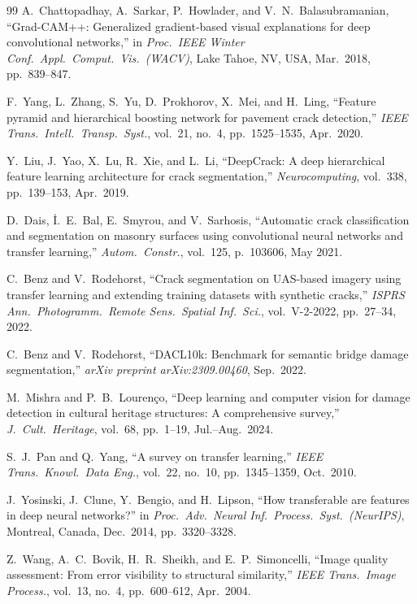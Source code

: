 \documentclass[12pt,a4paper]{article}
\begin{document}
\begin{thebibliography}{99}
A.~Chattopadhay, A.~Sarkar, P.~Howlader, and V.~N.~Balasubramanian,
``Grad-CAM++: Generalized gradient-based visual explanations for deep convolutional networks,''
in \textit{Proc.\ IEEE Winter Conf.\ Appl.\ Comput.\ Vis.\ (WACV)},
Lake Tahoe, NV, USA, Mar.\ 2018, pp.\ 839--847.

F.~Yang, L.~Zhang, S.~Yu, D.~Prokhorov, X.~Mei, and H.~Ling,
``Feature pyramid and hierarchical boosting network for pavement crack detection,''
\textit{IEEE Trans.\ Intell.\ Transp.\ Syst.},
vol.\ 21, no.\ 4, pp.\ 1525--1535, Apr.\ 2020.

Y.~Liu, J.~Yao, X.~Lu, R.~Xie, and L.~Li,
``DeepCrack: A deep hierarchical feature learning architecture for crack segmentation,''
\textit{Neurocomputing},
vol.\ 338, pp.\ 139--153, Apr.\ 2019.

D.~Dais, \.{I}.~E.~Bal, E.~Smyrou, and V.~Sarhosis,
``Automatic crack classification and segmentation on masonry surfaces using convolutional neural networks and transfer learning,''
\textit{Autom.\ Constr.},
vol.\ 125, p.\ 103606, May 2021.

C.~Benz and V.~Rodehorst,
``Crack segmentation on UAS-based imagery using transfer learning and extending training datasets with synthetic cracks,''
\textit{ISPRS Ann.\ Photogramm.\ Remote Sens.\ Spatial Inf.\ Sci.},
vol.\ V-2-2022, pp.\ 27--34, 2022.

C.~Benz and V.~Rodehorst,
``DACL10k: Benchmark for semantic bridge damage segmentation,''
\textit{arXiv preprint arXiv:2309.00460}, Sep.\ 2022.

M.~Mishra and P.~B.~Louren\c{c}o,
``Deep learning and computer vision for damage detection in cultural heritage structures: A comprehensive survey,''
\textit{J.\ Cult.\ Heritage},
vol.\ 68, pp.\ 1--19, Jul.--Aug.\ 2024.

S.~J.~Pan and Q.~Yang,
``A survey on transfer learning,''
\textit{IEEE Trans.\ Knowl.\ Data Eng.},
vol.\ 22, no.\ 10, pp.\ 1345--1359, Oct.\ 2010.

J.~Yosinski, J.~Clune, Y.~Bengio, and H.~Lipson,
``How transferable are features in deep neural networks?''
in \textit{Proc.\ Adv.\ Neural Inf.\ Process.\ Syst.\ (NeurIPS)},
Montreal, Canada, Dec.\ 2014, pp.\ 3320--3328.

Z.~Wang, A.~C.~Bovik, H.~R.~Sheikh, and E.~P.~Simoncelli,
``Image quality assessment: From error visibility to structural similarity,''
\textit{IEEE Trans.\ Image Process.},
vol.\ 13, no.\ 4, pp.\ 600--612, Apr.\ 2004.


\end{thebibliography}
\end{document}
